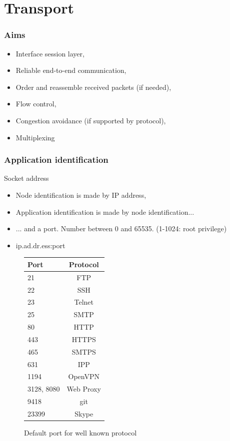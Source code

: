 \section{Transport}
  \begin{frame}
    \frametitle{Aims}
      \begin{itemize}
        \item Interface session layer,
        \item Reliable end-to-end communication,
        \item Order and reassemble received packets (if needed),
        \item Flow control,
        \item Congestion avoidance (if supported by protocol),
        \item Multiplexing
      \end{itemize}
  \end{frame}

  \begin{frame}
    \frametitle{Application identification}
    \begin{block}{Socket address}
      \begin{itemize}
        \item Node identification is made by IP address,
        \item Application identification is made by node identification...
        \item ... and a port. Number between 0 and 65535. (1-1024: root privilege)
        \item \begin{center} ip.ad.dr.ess:port \end{center}
      \end{itemize}
    \end{block}
  \end{frame}

  \begin{frame}
    \begin{figure}
      \centering
      \begin{tabular}{l|c}
        Port  & Protocol \\ \hline
        21    & FTP \\ \hline
        22    & SSH \\ \hline
        23    & Telnet \\ \hline
        25    & SMTP \\ \hline
        80    & HTTP \\ \hline
        443   & HTTPS \\ \hline
        465   & SMTPS \\ \hline
        631   & IPP \\ \hline
        1194  & OpenVPN \\ \hline
        3128, 8080 & Web Proxy \\ \hline
        9418  & git \\ \hline
        23399 & Skype \\ \hline
      \end{tabular}
      \caption{Default port for well known protocol}
      \label{fig:def-port}
    \end{figure}
  \end{frame}


